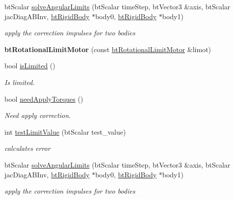 \begin{DoxyCompactItemize}
bt\+Scalar \hyperlink{classbtRotationalLimitMotor_ad52e9b1c402c7bdd47fb1a9de28afb7e}{solve\+Angular\+Limits} (bt\+Scalar time\+Step, bt\+Vector3 \&axis, bt\+Scalar jac\+Diag\+A\+B\+Inv, \hyperlink{classbtRigidBody}{bt\+Rigid\+Body} $\ast$body0, \hyperlink{classbtRigidBody}{bt\+Rigid\+Body} $\ast$body1)
\begin{DoxyCompactList}\small\item\em apply the correction impulses for two bodies \end{DoxyCompactList}\item 
\mbox{\label{classbtRotationalLimitMotor_a2e7652de69dacf8f37eaef5fd460f4a3}} 
{\bfseries bt\+Rotational\+Limit\+Motor} (const \hyperlink{classbtRotationalLimitMotor}{bt\+Rotational\+Limit\+Motor} \&limot)
\item 
\mbox{\label{classbtRotationalLimitMotor_ac47bf3f6fe0afc82d123407221d4cb10}} 
bool \hyperlink{classbtRotationalLimitMotor_ac47bf3f6fe0afc82d123407221d4cb10}{is\+Limited} ()
\begin{DoxyCompactList}\small\item\em Is limited. \end{DoxyCompactList}\item 
\mbox{\label{classbtRotationalLimitMotor_af8f10179d361ad46f5a4636822af6d7d}} 
bool \hyperlink{classbtRotationalLimitMotor_af8f10179d361ad46f5a4636822af6d7d}{need\+Apply\+Torques} ()
\begin{DoxyCompactList}\small\item\em Need apply correction. \end{DoxyCompactList}\item 
int \hyperlink{classbtRotationalLimitMotor_ac0651bd36beda2dbb23c45a90dc1cccd}{test\+Limit\+Value} (bt\+Scalar test\+\_\+value)
\begin{DoxyCompactList}\small\item\em calculates error \end{DoxyCompactList}\item 
\mbox{\label{classbtRotationalLimitMotor_ad52e9b1c402c7bdd47fb1a9de28afb7e}} 
bt\+Scalar \hyperlink{classbtRotationalLimitMotor_ad52e9b1c402c7bdd47fb1a9de28afb7e}{solve\+Angular\+Limits} (bt\+Scalar time\+Step, bt\+Vector3 \&axis, bt\+Scalar jac\+Diag\+A\+B\+Inv, \hyperlink{classbtRigidBody}{bt\+Rigid\+Body} $\ast$body0, \hyperlink{classbtRigidBody}{bt\+Rigid\+Body} $\ast$body1)
\begin{DoxyCompactList}\small\item\em apply the correction impulses for two bodies \end{DoxyCompactList}\end{DoxyCompactItemize}
